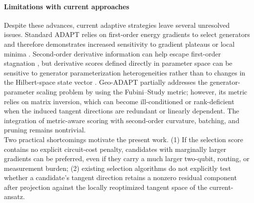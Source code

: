 \documentclass[
  reprint,
  amsmath,
  amssymb,
  aps,
  pra,
  nofootinbib,
  superscriptaddress,
  floatfix
]{revtex4-2}
\begin{document}
\paragraph*{Limitations with current approaches}
Despite these advances, current adaptive strategies leave several unresolved issues. Standard ADAPT relies on first-order energy gradients to select generators \cite{Grimsley2019,Tang2021,Yordanov2021} and therefore demonstrates increased sensitivity to gradient plateaus or local minima \cite{Feniou2023,Grimsley2023ADAPT}.
Second-order derivative information can help escape first-order stagnation \cite{Ramoa2025HessianRecycling}, but derivative scores defined directly in parameter space can be sensitive to generator parameterization heterogeneities rather than to changes in the Hilbert-space state vector \cite{ProvostVallee1980,Stokes2020QNG}. Geo-ADAPT partially addresses the generator-parameter scaling problem by using the Fubini--Study metric; however, its metric relies on matrix inversion, which can become ill-conditioned or rank-deficient when the induced tangent directions are redundant or linearly dependent\cite{Sohail2026GeoADAPT}. The integration of metric-aware scoring with second-order curvature, batching, and pruning remains nontrivial.\\
\noindent
Two practical shortcomings motivate the present work. (1) If the selection score contains no explicit circuit-cost penalty, candidates with marginally larger gradients can be preferred, even if they carry a much larger two-qubit, routing, or measurement burden; (2) existing selection algorithms do not explicitly test whether a candidate's tangent direction retains a nonzero residual component after projection against the locally reoptimized tangent space of the current-ansatz.
%
\end{document}
